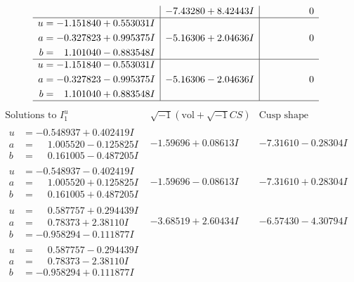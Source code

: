 \documentclass[1p]{elsarticle_modified}
\theoremstyle{definition}
\newcommand{\I}{\sqrt{-1}}
\begin{document}
$$\begin{array}{c|c|c}
 & -7.43280 + 8.42443 I & \phantom{-0.000000 } 0 \\ \hline\begin{aligned}
u &= -1.151840 + 0.553031 I \\
a &= -0.327823 + 0.995375 I \\
b &= \phantom{-}1.101040 - 0.883548 I\end{aligned}
 & -5.16306 + 2.04636 I & \phantom{-0.000000 } 0 \\ \hline\begin{aligned}
u &= -1.151840 - 0.553031 I \\
a &= -0.327823 - 0.995375 I \\
b &= \phantom{-}1.101040 + 0.883548 I\end{aligned}
 & -5.16306 - 2.04636 I & \phantom{-0.000000 } 0\\
 \hline 
 \end{array}$$\newpage$$\begin{array}{c|c|c}  
\text{Solutions to }I^u_{1}& \I (\text{vol} + \sqrt{-1}CS) & \text{Cusp shape}\\
 \hline 
\begin{aligned}
u &= -0.548937 + 0.402419 I \\
a &= \phantom{-}1.005520 - 0.125825 I \\
b &= \phantom{-}0.161005 - 0.487205 I\end{aligned}
 & -1.59696 + 0.08613 I & -7.31610 - 0.28304 I \\ \hline\begin{aligned}
u &= -0.548937 - 0.402419 I \\
a &= \phantom{-}1.005520 + 0.125825 I \\
b &= \phantom{-}0.161005 + 0.487205 I\end{aligned}
 & -1.59696 - 0.08613 I & -7.31610 + 0.28304 I \\ \hline\begin{aligned}
u &= \phantom{-}0.587757 + 0.294439 I \\
a &= \phantom{-}0.78373 + 2.38110 I \\
b &= -0.958294 - 0.111877 I\end{aligned}
 & -3.68519 + 2.60434 I & -6.57430 - 4.30794 I \\ \hline\begin{aligned}
u &= \phantom{-}0.587757 - 0.294439 I \\
a &= \phantom{-}0.78373 - 2.38110 I \\
b &= -0.958294 + 0.111877 I\end{aligned}

\end{array}$$
\end{document}
